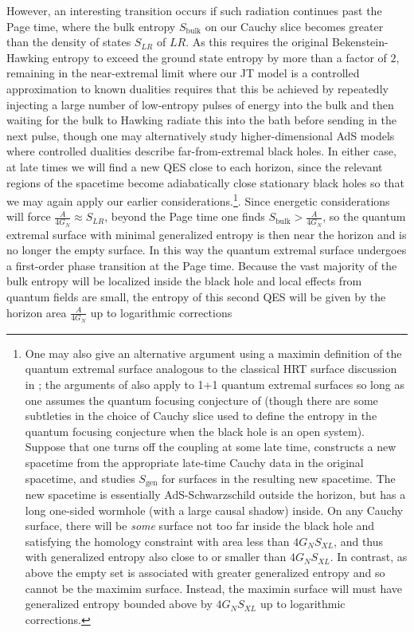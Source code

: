 \documentclass[12pt]{article}
\begin{document}
However, an interesting transition occurs if such radiation continues past the Page time, where the bulk entropy $S_{\mathrm{bulk}}$ on our Cauchy slice becomes greater than the density of states $S_{LR}$ of $LR$.  As this requires the original Bekenstein-Hawking entropy to exceed the ground state entropy by more than a factor of $2$, remaining in the near-extremal limit where our JT model is a controlled approximation to known dualities requires that this be achieved by repeatedly injecting a large number of low-entropy pulses of energy into the bulk and then waiting for the bulk to Hawking radiate this into the bath before sending in the next pulse, though one may alternatively study higher-dimensional AdS models where controlled dualities describe far-from-extremal black holes.  In either case, at late times we will find a new QES close to each horizon, since the relevant regions of the spacetime become adiabatically close stationary black holes so that we may again apply our earlier considerations.\footnote{One may also give an alternative argument using a maximin definition of the quantum extremal surface analogous to the classical HRT surface discussion in \cite{Wall:2012uf}; the arguments of \cite{Wall:2012uf} also apply to 1+1 quantum extremal surfaces so long as one assumes the quantum focusing conjecture of \cite{Bousso:2015mna} (though there are some subtleties in the choice of Cauchy slice used to define the entropy in the quantum focusing conjecture when the black hole is an open system).  Suppose that one turns off  the coupling at some late time, constructs a new spacetime from the appropriate late-time Cauchy data in the original spacetime, and studies $S_{\mathrm{gen}}$ for surfaces in the resulting new spacetime.  The new spacetime is essentially AdS-Schwarzschild outside the horizon, but has a long one-sided wormhole (with a large causal shadow) inside.  On any Cauchy surface, there will be {\it some} surface not too far inside the black hole and satisfying the homology constraint with area less than $4G_{N}S_{XL}$, and thus with generalized entropy also close to or smaller than $4G_{N}S_{XL}$.  In contrast, as above the empty set is associated with greater generalized entropy and so cannot be the maximim surface.  Instead, the maximin surface will must have generalized entropy bounded above by $4G_{N}S_{XL}$ up to logarithmic corrections.}.  Since energetic considerations will force $\frac{A}{4G_{N}} \approx S_{LR}$, beyond the Page time one finds $S_{\mathrm{bulk}} > \frac{A}{4G_{N}}$, so the quantum extremal surface with minimal generalized entropy is then near the horizon and is no longer the empty surface.  In this way the quantum extremal surface undergoes a first-order phase transition at the Page time.  Because the vast majority of the bulk entropy will be localized inside the black hole and local effects from quantum fields are small, the entropy of this second QES will be given by the horizon area $\frac{A}{4G_{N}}$ up to logarithmic corrections
\end{document}
